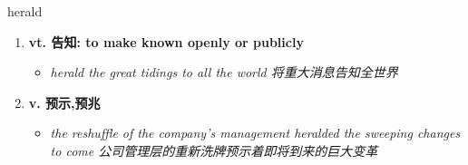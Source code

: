
\begin{frame}
{\huge herald}
\begin{center}
\begin{enumerate}\Large
  \item \textbf{vt. 告知: to make known openly or publicly}
  \begin{itemize}
    \item \em{\Large{herald the great tidings to all the world 将重大消息告知全世界}}
  \end{itemize}
  \item \textbf{v. 预示,预兆}
  \begin{itemize}
    \item \em{\Large{the reshuffle of the company's management heralded the sweeping changes to come 公司管理层的重新洗牌预示着即将到来的巨大变革}}
  \end{itemize}
\end{enumerate}
\end{center}
\end{frame}
